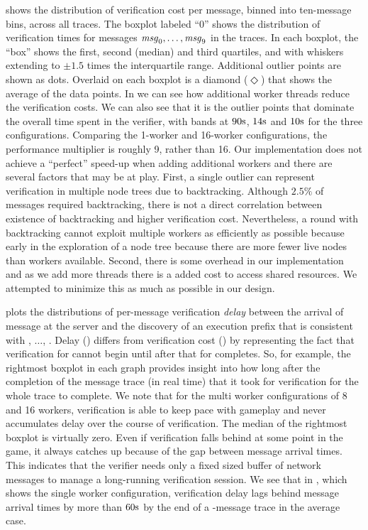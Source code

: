  shows the distribution of
verification cost per message, binned into ten-message bins, across
all \tetrinetTraces traces.  The boxplot labeled ``0'' shows the
distribution of verification times for messages
$\mathit{msg}_{0},\ldots,\mathit{msg}_{9}$ in the \tetrinetTraces traces. In each
boxplot, the ``box'' shows the first, second (median) and third
quartiles, and with whiskers extending to $\pm 1.5$ times the
interquartile range.  Additional outlier points are shown as dots.
Overlaid on each boxplot is a diamond ($\Diamond$) that shows the
average of the data points. In  we can see how additional
worker threads reduce the verification costs. We can also see that it
is the outlier points that dominate the overall time spent in the
verifier, with bands at $90\mathrm{s}$, $14\mathrm{s}$ and $10\mathrm{s}$ for the
three configurations.
Comparing the 1-worker and 16-worker configurations, the performance
multiplier is roughly 9, rather than 16. Our implementation does not
achieve a ``perfect'' speed-up when adding additional workers and
there are several factors that may be at play.
First, a single outlier can represent
verification in multiple node trees due to backtracking. 
Although $2.5\%$ of \tetrinet messages required backtracking, there
is not a direct correlation between existence of backtracking and
higher verification cost. Nevertheless, a round with backtracking cannot
exploit multiple workers as efficiently as possible because early in
the exploration of a node tree because there are more fewer live nodes than
workers available. Second, there is some overhead in our
implementation and as we add more threads there is a added cost to
access shared resources. We attempted to minimize this as much as
possible in our design. 

 plots the distributions of
per-message verification \textit{delay} between the arrival of message
\msg{\msgNmbr} at the server and the discovery of an execution prefix
\execPrefix{\msgNmbr} that is consistent with , $\ldots$,
\msg{\msgNmbr}.  Delay () differs
from verification cost () by
representing the fact that verification for \msg{\msgNmbr} cannot
begin until after that for  completes.  So, for
example, the rightmost boxplot in each graph provides insight into how
long after the completion of the message trace (in real time) that it
took for verification for the whole trace to complete. We note that
for the multi worker configurations of 8 and 16 workers, verification
is able to keep pace with gameplay and never accumulates delay over
the course of verification. The median of the rightmost boxplot is
virtually zero. Even if verification falls behind at some point in the
game, it always catches up because of the gap between message arrival
times. This indicates that the verifier needs only a fixed sized
buffer of network messages to manage a long-running verification
session. We see that in , which
shows the single worker configuration, verification delay lags behind
message arrival times by more than $60\mathrm{s}$ by the end of a
\tetrinetTraceLength-message trace in the average case. 

